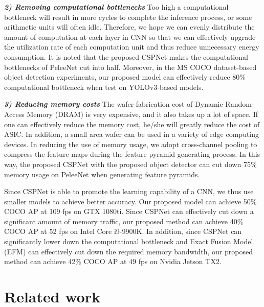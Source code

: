 \documentclass{article}
\begin{document}
\textit{\textbf{2) Removing computational bottlenecks }} Too high a computational bottleneck will result in more cycles to complete the inference process, or some arithmetic units will often idle.  Therefore, we hope we can evenly distribute the amount of computation at each layer in CNN so that we can effectively upgrade the utilization rate of each computation unit and thus reduce unnecessary energy consumption.  It is noted that the proposed CSPNet makes the computational bottlenecks of PeleeNet \cite{wang2018pelee} cut into half.  Moreover, in the MS COCO \cite{lin2014microsoft} dataset-based object detection experiments, our proposed model can effectively reduce 80\% computational bottleneck when test on YOLOv3-based models.

\textit{\textbf{3) Reducing memory costs }} The wafer fabrication cost of Dynamic Random-Access Memory (DRAM) is very expensive, and it also takes up a lot of space.  If one can effectively reduce the memory cost, he/she will greatly reduce the cost of ASIC.  In addition, a small area wafer can be used in a variety of edge computing devices.  In reducing the use of memory usage, we adopt cross-channel pooling \cite{goodfellow2013maxout} to compress the feature maps during the feature pyramid generating process.  In this way, the proposed CSPNet with the proposed object detector can cut down 75\% memory usage on PeleeNet when generating feature pyramids.

Since CSPNet is able to promote the learning capability of a CNN, we thus use smaller models to achieve better accuracy.  Our proposed model can achieve 50\% COCO AP at 109 fps on GTX 1080ti.  Since CSPNet can effectively cut down a significant amount of memory traffic, our proposed method can achieve 40\% COCO AP at 52 fps on Intel Core i9-9900K.  In addition, since CSPNet can significantly lower down the computational bottleneck and Exact Fusion Model (EFM) can effectively cut down the required memory bandwidth, our proposed method can achieve 42\% COCO AP at 49 fps on Nvidia Jetson TX2.

\section{Related work}
\end{document}
